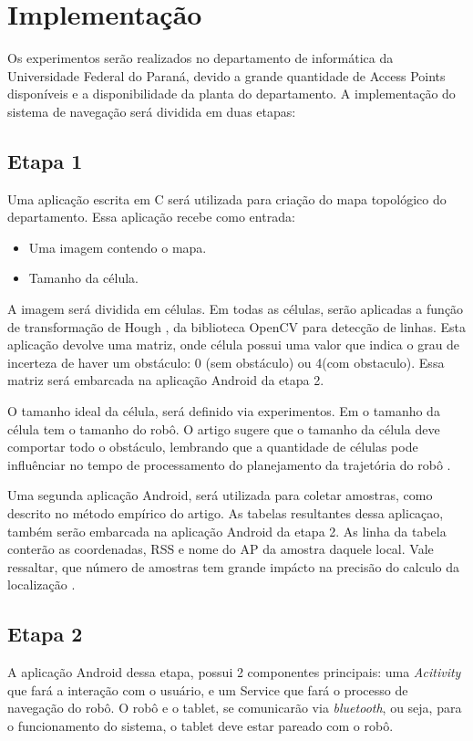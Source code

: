 \documentclass[12pt]{article}
\begin{document}
\clearpage
\section{Implementação}	 
  Os experimentos serão realizados no departamento de informática da Universidade Federal do Paraná, 
  devido a grande quantidade de Access Points disponíveis e a disponibilidade da planta do departamento. 
  A implementação do sistema de navegação será dividida em duas etapas:
  \subsection{Etapa 1}
  
  Uma aplicação escrita em C será utilizada para criação do mapa topológico do departamento. Essa aplicação recebe como entrada:
  \begin{itemize}
    \item Uma imagem contendo o mapa.
    \item Tamanho da célula.
  \end{itemize}
 
  A imagem será dividida em células. Em todas as células, serão aplicadas a função de transformação de Hough \cite{openCV}, da biblioteca OpenCV para detecção de linhas. 
  Esta aplicação devolve uma matriz, onde célula possui uma valor que indica o grau de incerteza de haver um obstáculo: 0 (sem obstáculo) ou 4(com obstaculo). 
  Essa matriz será embarcada na aplicação Android da etapa 2.
  
  O tamanho ideal da célula, será definido via experimentos. Em \cite{cnn} o tamanho da célula tem o tamanho do robô. O artigo \cite{dlite} sugere que o tamanho da célula deve 
  comportar todo o obstáculo, lembrando que a quantidade de células pode influênciar no tempo de processamento do planejamento da trajetória do robô \cite{voronoi}.
  
    Uma segunda aplicação Android, será utilizada para coletar amostras, como descrito no método empírico do artigo\cite{wifiRadar}. As tabelas resultantes dessa aplicaçao, também serão 
  embarcada na aplicação Android da etapa 2. As linha da tabela conterão as coordenadas, RSS e nome do AP da amostra daquele local. Vale ressaltar, que número de amostras tem grande impácto 
  na precisão do calculo da localização \cite{wifiRadar}.
  
  \subsection{Etapa 2}
	A aplicação Android dessa etapa, possui 2 componentes principais: uma \textit{Acitivity} \cite{activity} que fará a interação com o usuário, 
	e um Service \cite{service} que fará o processo de navegação do robô. O robô e o tablet, se comunicarão via \textit{bluetooth},
	ou seja, para o funcionamento do sistema, o tablet deve estar pareado com o robô.
\end{document}
